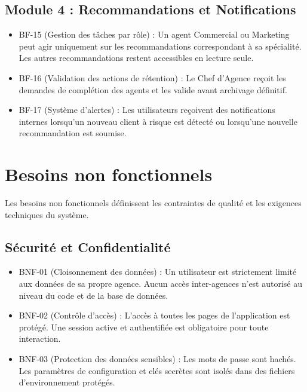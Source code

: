 \subsection{Module 4 : Recommandations et Notifications}
\begin{itemize}
    \item BF-15 (Gestion des tâches par rôle) : Un agent Commercial ou Marketing peut agir uniquement sur les recommandations correspondant à sa spécialité. Les autres recommandations restent accessibles en lecture seule.
    \item BF-16 (Validation des actions de rétention) : Le Chef d'Agence reçoit les demandes de complétion des agents et les valide avant archivage définitif.
    \item BF-17 (Système d'alertes) : Les utilisateurs reçoivent des notifications internes lorsqu'un nouveau client à risque est détecté ou lorsqu'une nouvelle recommandation est soumise.
\end{itemize}

\section{Besoins non fonctionnels}

Les besoins non fonctionnels définissent les contraintes de qualité et les exigences techniques du système.

\subsection{Sécurité et Confidentialité}
\begin{itemize}
    \item BNF-01 (Cloisonnement des données) : Un utilisateur est strictement limité aux données de sa propre agence. Aucun accès inter-agences n'est autorisé au niveau du code et de la base de données.
    \item BNF-02 (Contrôle d'accès) : L'accès à toutes les pages de l'application est protégé. Une session active et authentifiée est obligatoire pour toute interaction.
    \item BNF-03 (Protection des données sensibles) : Les mots de passe sont hachés. Les paramètres de configuration et clés secrètes sont isolés dans des fichiers d'environnement protégés.
\end{itemize}

